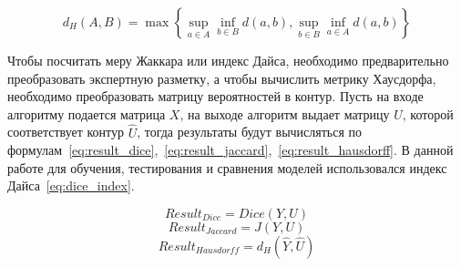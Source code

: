 \begin{equation}\label{eq:hausdorff_distance}
  d_{H}(A,B)=\max\left\{\sup_{a\in{}A}\inf_{b\in{}B}d(a,b),\sup_{b\in{}B}\inf_{a\in{}A}d(a,b)\right\}
\end{equation}

\clearpage
Чтобы посчитать меру Жаккара или индекс Дайса, необходимо 
предварительно преобразовать экспертную разметку, а чтобы 
вычислить метрику Хаусдорфа, необходимо преобразовать матрицу 
вероятностей в контур. Пусть на входе алгоритму подается 
матрица $X$, на выходе алгоритм выдает матрицу $U$, которой
соответствует контур $\hat{U}$, тогда результаты будут 
вычисляться по формулам~\eqref{eq:result_dice},~\eqref{eq:result_jaccard},~\eqref{eq:result_hausdorff}. В данной работе для обучения, тестирования и сравнения моделей использовался индекс Дайса~\eqref{eq:dice_index}.

\begin{equation}\label{eq:result_dice}
  Result_{Dice} = Dice(Y, U)
\end{equation}
\begin{equation}\label{eq:result_jaccard}
  Result_{Jaccard} = J(Y, U)
\end{equation}
\begin{equation}\label{eq:result_hausdorff}
  Result_{Hausdorff} = d_{H}(\hat{Y}, \hat{U})
\end{equation}
